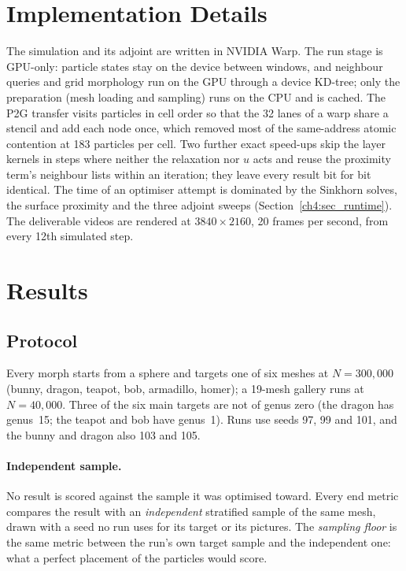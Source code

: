 \section{Implementation Details}
\label{sec:implementation}

The simulation and its adjoint are written in NVIDIA Warp. The run stage is GPU-only: particle states stay on the
device between windows, and neighbour queries and grid morphology run on the GPU through a device KD-tree; only the
preparation (mesh loading and sampling) runs on the CPU and is cached. The P2G transfer visits particles in cell order
so that the 32 lanes of a warp share a stencil and add each node once, which removed most of the same-address atomic
contention at 183 particles per cell. Two further exact speed-ups skip the layer kernels in steps where neither the
relaxation nor $u$ acts and reuse the proximity term's neighbour lists within an iteration; they leave every result
bit for bit identical. The time of an optimiser attempt is dominated by the Sinkhorn solves, the surface proximity and
the three adjoint sweeps (Section~\ref{ch4:sec_runtime}). The deliverable videos are rendered at $3840\times2160$,
20 frames per second, from every 12th simulated step.

\section{Results}
\label{sec:results}

\subsection{Protocol}
\label{ch4:sec_protocol}
Every morph starts from a sphere and targets one of six meshes at $N=300{,}000$ (bunny, dragon, teapot, bob, armadillo,
homer); a 19-mesh gallery runs at $N=40{,}000$. Three of the six main targets are not of genus zero (the dragon has
genus~15; the teapot and bob have genus~1). Runs use seeds 97, 99 and 101, and the bunny and dragon also 103 and 105.

\paragraph{Independent sample.} No result is scored against the sample it was optimised toward. Every end metric
compares the result with an \emph{independent} stratified sample of the same mesh, drawn with a seed no run uses for
its target or its pictures. The \emph{sampling floor} is the same metric between the run's own target sample and the
independent one: what a perfect placement of the particles would score.

